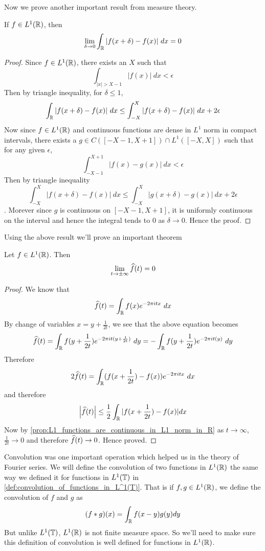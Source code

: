   Now we prove another important result from measure theory.
  \begin{proposition}
    \label{prop:L1_functions_are_continuous_in_L1_norm_in_R}
    If $f \in L^1(\mathbb R)$, then $$\lim_{\delta \to 0} \int_\mathbb R |f(x+\delta) - f(x)| \ dx = 0$$
  \end{proposition}
  \begin{proof}
    Since $f\in L^1(\mathbb R)$, there exists an $X$ such that $$\int_{|x|>X-1} |f(x)| \ dx < \epsilon$$
    Then by triangle inequality, for $\delta \le 1$, $$\int_\mathbb R |f(x+\delta) - f(x)| \ dx \le \int_{-X}^X |f(x+\delta) - f(x)| \ dx + 2\epsilon$$
    Now since $f \in L^1(\mathbb R)$ and continuous functions are dense in $L^1$ norm in compact intervals, there exists a $g \in C([-X-1, X+1]) \cap L^1([-X, X])$ such that for any given $\epsilon$, $$\int_{-X-1}^{X+1} |f(x) - g(x)| \ dx < \epsilon$$
    Then by triangle inequality $$\int_{-X}^X |f(x+\delta) - f(x)| \ dx \le \int_{-X}^X |g(x+\delta) - g(x)| \ dx + 2\epsilon$$. Morever since $g$ is continuous on $[-X-1, X+1]$, it is uniformly continuous on the interval and hence the integral tends to $0$ as $\delta \to 0$. Hence the proof.
  \end{proof}

  Using the above result we'll prove an important theorem
  \begin{theorem}
    Let $f \in L^1(\mathbb R)$. Then $$\lim_{t \to \pm \infty} \widehat{f}(t) = 0$$
  \end{theorem}
  \begin{proof}
    We know that $$\widehat{f}(t) = \int_\mathbb R f(x)e^{-2 \pi itx} \ dx $$
    By change of variables $x = y + \frac{1}{2t}$, we see that the above equation becomes $$\widehat{f}(t) = \int_\mathbb R f(y + \frac{1}{2t})e^{-2 \pi it(y+ \frac{1}{2t})} \ dy = -\int_\mathbb R f(y + \frac{1}{2t})e^{-2 \pi it(y)} \ dy  $$
    Therefore $$2\widehat{f}(t) = \int_\mathbb R (f(x + \frac{1}{2t}) - f(x))e^{-2 \pi itx} \ dx $$
    and therefore $$\left|\widehat{f}(t)\right| \le \frac{1}{2} \int_\mathbb R |f(x + \frac{1}{2t}) - f(x)| dx$$
    Now by \autoref{prop:L1_functions_are_continuous_in_L1_norm_in_R} as $t \to \infty$, $\frac{1}{2t} \to 0$ and therefore $\widehat{f}(t) \to 0$. Hence proved. 
  \end{proof}

  Convolution was one important operation which helped us in the theory of Fourier series. We will define the convolution of two functions in $L^1(\mathbb R)$ the same way we defined it for functions in $L^1(\mathbb T)$ in \autoref{def:convolution_of_functions_in_L^1(T)}. That is if $f, g \in L^1(\mathbb R)$, we define the convolution of $f$ and $g$ as $$(f*g)(x) = \int_{\mathbb R} f(x-y)g(y) dy$$
  But unlike $L^1(\mathbb T)$, $L^1(\mathbb R)$ is not finite measure space. So we'll need to make sure this definition of convolution is well defined for functions in $L^1(\mathbb R)$. 

